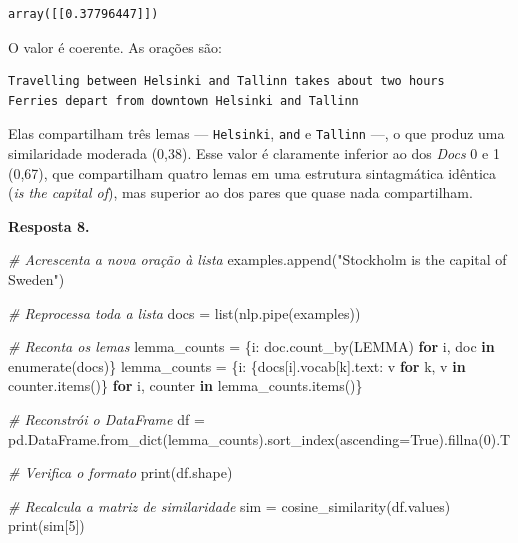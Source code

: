 \documentclass[
  brazilian,
]{article}
\newenvironment{Shaded}{}{}
\newcommand{\BuiltInTok}[1]{#1}
\newcommand{\CommentTok}[1]{\textcolor[rgb]{0.38,0.63,0.69}{\textit{#1}}}
\newcommand{\ControlFlowTok}[1]{\textcolor[rgb]{0.00,0.44,0.13}{\textbf{#1}}}
\newcommand{\DecValTok}[1]{\textcolor[rgb]{0.25,0.63,0.44}{#1}}
\newcommand{\KeywordTok}[1]{\textcolor[rgb]{0.00,0.44,0.13}{\textbf{#1}}}
\newcommand{\NormalTok}[1]{#1}
\newcommand{\OperatorTok}[1]{\textcolor[rgb]{0.40,0.40,0.40}{#1}}
\newcommand{\StringTok}[1]{\textcolor[rgb]{0.25,0.44,0.63}{#1}}
\newcommand{\VariableTok}[1]{\textcolor[rgb]{0.10,0.09,0.49}{#1}}
\begin{document}
\begin{verbatim}
array([[0.37796447]])
\end{verbatim}

O valor é coerente. As orações são:

\begin{verbatim}
Travelling between Helsinki and Tallinn takes about two hours
Ferries depart from downtown Helsinki and Tallinn
\end{verbatim}

Elas compartilham três lemas --- \texttt{Helsinki}, \texttt{and} e
\texttt{Tallinn} ---, o que produz uma similaridade moderada (0,38).
Esse valor é claramente inferior ao dos \emph{Docs} 0 e 1 (0,67), que
compartilham quatro lemas em uma estrutura sintagmática idêntica
(\emph{is the capital of}), mas superior ao dos pares que quase nada
compartilham.

\textbf{Resposta 8.}

\begin{Shaded}
\begin{Highlighting}[]
\CommentTok{\# Acrescenta a nova oração à lista}
\NormalTok{examples.append(}\StringTok{"Stockholm is the capital of Sweden"}\NormalTok{)}

\CommentTok{\# Reprocessa toda a lista}
\NormalTok{docs }\OperatorTok{=} \BuiltInTok{list}\NormalTok{(nlp.pipe(examples))}

\CommentTok{\# Reconta os lemas}
\NormalTok{lemma\_counts }\OperatorTok{=}\NormalTok{ \{i: doc.count\_by(LEMMA) }\ControlFlowTok{for}\NormalTok{ i, doc }\KeywordTok{in} \BuiltInTok{enumerate}\NormalTok{(docs)\}}
\NormalTok{lemma\_counts }\OperatorTok{=}\NormalTok{ \{i: \{docs[i].vocab[k].text: v }\ControlFlowTok{for}\NormalTok{ k, v }\KeywordTok{in}\NormalTok{ counter.items()\}}
                \ControlFlowTok{for}\NormalTok{ i, counter }\KeywordTok{in}\NormalTok{ lemma\_counts.items()\}}

\CommentTok{\# Reconstrói o DataFrame}
\NormalTok{df }\OperatorTok{=}\NormalTok{ pd.DataFrame.from\_dict(lemma\_counts).sort\_index(ascending}\OperatorTok{=}\VariableTok{True}\NormalTok{).fillna(}\DecValTok{0}\NormalTok{).T}

\CommentTok{\# Verifica o formato}
\BuiltInTok{print}\NormalTok{(df.shape)}

\CommentTok{\# Recalcula a matriz de similaridade}
\NormalTok{sim }\OperatorTok{=}\NormalTok{ cosine\_similarity(df.values)}
\BuiltInTok{print}\NormalTok{(sim[}\DecValTok{5}\NormalTok{])}
\end{Highlighting}
\end{Shaded}
\end{document}
